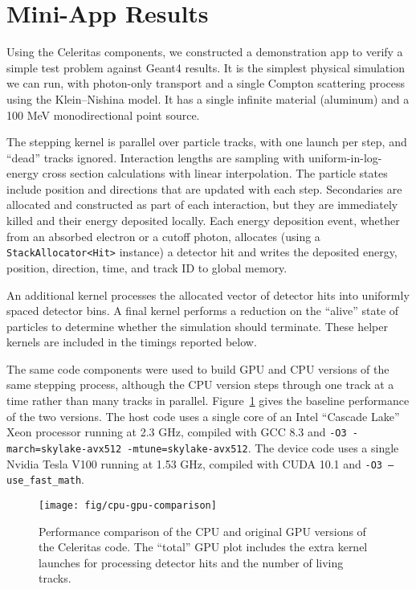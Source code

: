 \documentclass{webofc}
\begin{document}
\section{Mini-App Results}
\label{sec:miniapp}

Using the Celeritas components, we constructed a demonstration app to verify a
simple test problem against Geant4 results. It is the simplest physical
simulation we can run, with photon-only transport and a single
Compton scattering process using the Klein--Nishina model.  It has a single
infinite material (aluminum) and a 100 MeV monodirectional point source.

The stepping kernel is parallel over particle tracks, with one launch per step,
and ``dead'' tracks ignored. Interaction lengths are sampling with
uniform-in-log-energy cross section calculations with linear interpolation. The
particle states include position and directions that are updated with each step.
Secondaries are allocated and constructed as part of each interaction, but they
are immediately killed and their energy deposited locally. Each energy
deposition event, whether from an absorbed electron or a cutoff photon,
allocates (using a \texttt{StackAllocator<Hit>} instance) a detector hit and
writes the deposited energy, position, direction, time, and track ID to global
memory.

An additional kernel processes the allocated vector of detector hits into
uniformly spaced detector bins. A final kernel performs a reduction on the
``alive'' state of particles to determine whether the simulation should
terminate. These helper kernels are included in the timings reported below.

The same code components were used to build GPU and CPU versions of the same
stepping process, although the CPU version steps through one track at a time
rather than many tracks in parallel.  Figure~\ref{fig:baseline} gives the
baseline performance of the two versions. The host code uses a single core of an
Intel ``Cascade Lake'' Xeon processor running at 2.3 GHz, compiled with GCC 8.3
and \texttt{-O3 -march=skylake-avx512 -mtune=skylake-avx512}. The device code
uses a single Nvidia Tesla V100 running at 1.53 GHz, compiled with CUDA 10.1 and
\texttt{-O3 --use\_fast\_math}.

\begin{figure}[htb]
  \centering
  \texttt{[image: fig/cpu-gpu-comparison]}
  \caption{Performance comparison of the CPU and original GPU versions of the
  Celeritas code. The ``total'' GPU plot includes the extra kernel launches for
  processing detector hits and the number of living tracks.}
  \label{fig:baseline}
\end{figure}
\end{document}
